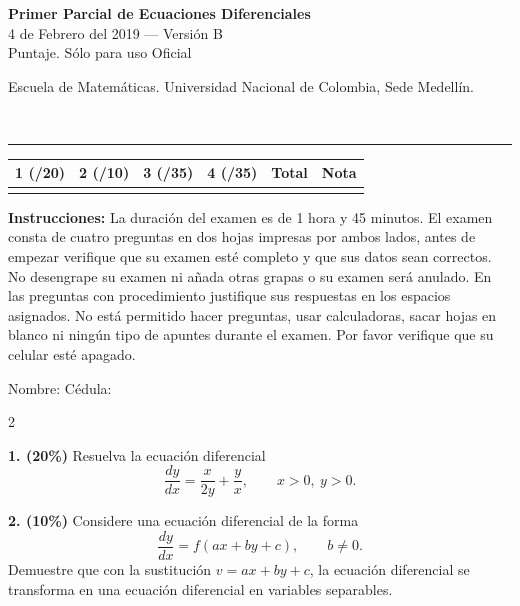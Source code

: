 \documentclass[11pt]{article}
\begin{document}
\noindent
\begin{minipage}[t]{0.62\linewidth}
  {\bfseries\large Primer Parcial de Ecuaciones Diferenciales}\\[2pt]
  {\small 4 de Febrero del 2019 --- Versión B}\\
  {\small Puntaje. Sólo para uso Oficial}
\end{minipage}%
\hfill
\begin{minipage}[t]{0.35\linewidth}
  \raggedleft\small Escuela de Matemáticas. Universidad Nacional de Colombia, Sede Medellín.
\end{minipage}\\[4pt]
\rule{\linewidth}{0.6pt}

\vspace{4pt}
\noindent
\begin{tabular}{|c|c|c|c|c|c|}
\hline
1 (/20) & 2 (/10) & 3 (/35) & 4 (/35) & Total & Nota \\
\hline
 & & & & & \\
\hline
\end{tabular}

\vspace{6pt}
\noindent\textbf{Instrucciones:} La duración del examen es de 1 hora y 45 minutos. El examen consta de cuatro preguntas en dos hojas impresas por ambos lados, antes de empezar verifique que su examen esté completo y que sus datos sean correctos. No desengrape su examen ni añada otras grapas o su examen será anulado. En las preguntas con procedimiento justifique sus respuestas en los espacios asignados. No está permitido hacer preguntas, usar calculadoras, sacar hojas en blanco ni ningún tipo de apuntes durante el examen. Por favor verifique que su celular esté apagado.

\vspace{8pt}
\noindent Nombre: \makebox[0.45\linewidth]{\hrulefill} \hfill Cédula: \makebox[0.3\linewidth]{\hrulefill}

\begin{multicols}{2}

\textbf{1. (20\%)} Resuelva la ecuación diferencial
\[
\frac{dy}{dx}=\frac{x}{2y}+\frac{y}{x}, \qquad x>0,\ y>0.
\]

\vspace{5cm}

\columnbreak

\textbf{2. (10\%)} Considere una ecuación diferencial de la forma
\[
\frac{dy}{dx}=f(ax+by+c), \qquad b\neq 0.
\]
Demuestre que con la sustitución $v=ax+by+c$, la ecuación diferencial se transforma en una ecuación diferencial en variables separables.

\end{multicols}
\end{document}
